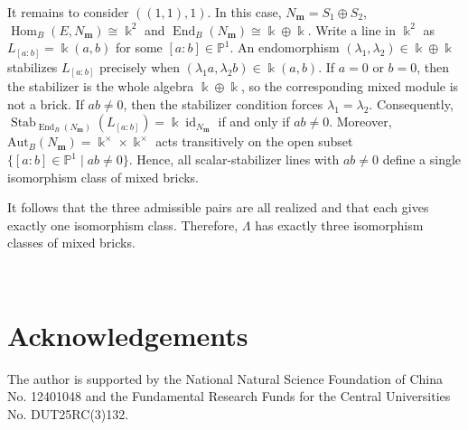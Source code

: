 \documentclass[a4,12pt]{amsart}
\numberwithin{equation}{section} %
\def\Hom{\operatorname{Hom}} %
\def\End{\operatorname{End}} %
\def\Stab{\operatorname{Stab}} %
\def\Aut{\mathrm{Aut}} %
\theoremstyle{definition} %
\begin{document}
It remains to consider $((1,1),1)$. In this case, $N_{\mathbf{m}}=S_1\oplus S_2$, $\Hom_B(E,N_{\mathbf{m}})\cong\Bbbk^2$ and $\End_B(N_{\mathbf{m}}) \cong \Bbbk\oplus\Bbbk$. Write a line in $\Bbbk^2$ as $L_{[a:b]}=\Bbbk(a,b)$ for some $[a:b]\in\mathbb{P}^1$. An endomorphism $(\lambda_1,\lambda_2)\in\Bbbk\oplus\Bbbk$
stabilizes $L_{[a:b]}$ precisely when $(\lambda_1a,\lambda_2b)\in\Bbbk(a,b)$. If $a=0$ or $b=0$, then the stabilizer is the whole algebra
$\Bbbk\oplus\Bbbk$, so the corresponding mixed module is not a
brick. If $ab\neq0$, then the stabilizer condition forces $\lambda_1=\lambda_2$. Consequently, $\Stab_{\End_B(N_{\mathbf{m}})}(L_{[a:b]}) = \Bbbk\operatorname{id}_{N_{\mathbf{m}}}$ if and only if $ab\neq0$. Moreover, $\Aut_B(N_{\mathbf{m}}) = \Bbbk^{\times}\times\Bbbk^{\times}$ acts transitively on the open subset $\{[a:b]\in\mathbb{P}^1\mid ab\neq0\}$. Hence, all scalar-stabilizer lines with $ab\neq0$ define a single isomorphism class of mixed bricks. 

It follows that the three admissible pairs are all realized and that each gives exactly one isomorphism class. Therefore, $\Lambda$ has exactly three isomorphism classes of mixed bricks. 

\ \\
\section*{Acknowledgements}
The author is supported by the National Natural Science Foundation of China No. 12401048 and the Fundamental Research Funds for the Central Universities No. DUT25RC(3)132.

\ \\



\ \\
\end{document}

